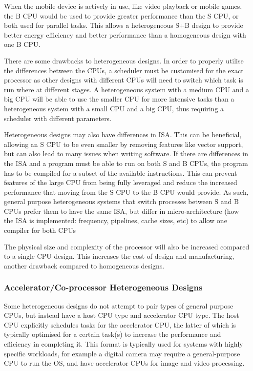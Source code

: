 When the mobile device is actively in use, like video playback or mobile games, the B CPU would be used to provide greater performance than the S CPU, or both used for parallel tasks. This allows a heterogeneous S+B design to provide better energy efficiency and better performance than a homogeneous design with one B CPU.

There are some drawbacks to heterogeneous designs. In order to properly utilise the differences between the CPUs, a scheduler must be customised for the exact processor as other designs with different CPUs will need to switch which task is run where at different stages. A heterogeneous system with a medium CPU and a big CPU will be able to use the smaller CPU for more intensive tasks than a heterogeneous system with a small CPU and a big CPU, thus requiring a scheduler with different parameters.

Heterogeneous designs may also have differences in ISA. This can be beneficial, allowing an S CPU to be even smaller by removing features like vector support, but can also lead to many issues when writing software. If there are differences in the ISA and a program must be able to run on both S and B CPUs, the program has to be compiled for a subset of the available instructions. This can prevent features of the large CPU from being fully leveraged and reduce the increased performance that moving from the S CPU to the B CPU would provide. As such, general purpose heterogeneous systems that switch processes between S and B CPUs prefer them to have the same ISA, but differ in micro-architecture (how the ISA is implemented: frequency, pipelines, cache sizes, etc) to allow one compiler for both CPUs

The physical size and complexity of the processor will also be increased compared to a single CPU design. This increases the cost of design and manufacturing, another drawback compared to homogeneous designs.

\subsubsection{Accelerator/Co-processor Heterogeneous Designs}
Some heterogeneous designs do not attempt to pair types of general purpose CPUs, but instead have a host CPU type and accelerator CPU type. The host CPU explicitly schedules tasks for the accelerator CPU, the latter of which is typically optimised for a certain task(s) to increase the performance and efficiency in completing it. This format is typically used for systems with highly specific workloads, for example a digital camera may require a general-purpose CPU to run the OS, and have accelerator CPUs for image and video processing.

